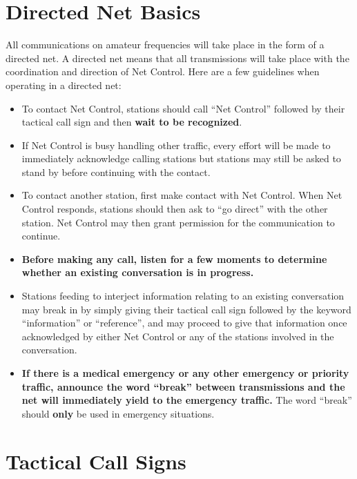\documentclass[pdflatex,letterpaper,twoside,12pt]{book}
\begin{document}
\section{Directed Net Basics}

All communications on amateur frequencies will take place in the form of a directed net.  A directed net means that all transmissions will take place with the coordination and direction of Net Control.  Here are a few guidelines when operating in a directed net:

\begin{itemize}

	\item To contact Net Control, stations should call ``Net Control'' followed by their tactical call sign and then \textbf{wait to be recognized}.
	\item If Net Control is busy handling other traffic, every effort will be made to immediately acknowledge calling stations but stations may still be asked to stand by before continuing with the contact.
	\item To contact another station, first make contact with Net Control.  When Net Control responds, stations should then ask to ``go direct'' with the other station.  Net Control may then grant permission for the communication to continue.
	\item \textbf{Before making any call, listen for a few moments to determine whether an existing conversation is in progress.}
	\item Stations feeding to interject information relating to an existing conversation may break in by simply giving their tactical call sign followed by the keyword ``information'' or ``reference'', and may proceed to give that information once acknowledged by either Net Control or any of the stations involved in the conversation.
	\item \textbf{If there is a medical emergency or any other emergency or priority traffic, announce the word ``break'' between transmissions and the net will immediately yield to the emergency traffic.}  The word ``break'' should \textbf{only} be used in emergency situations.

\end{itemize}


\section{Tactical Call Signs}
\end{document}
